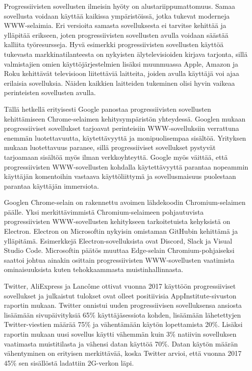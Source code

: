 \documentclass[utf8]{gradu3}
\begin{document}
Progressiivisten sovellusten ilmeisin hyöty on alustariippumattomuus. Samaa sovellusta voidaan käyttää kaikissa ympäristöissä, jotka tukevat moderneja WWW-selaimia. Eri versioita samasta sovelluksesta ei tarvitse kehittää ja ylläpitää erikseen, joten progressiivisten sovellusten avulla voidaan säästää kalliita työresursseja. Hyvä esimerkki progressiivisten sovellusten käyttöä tukevasta markkinatilanteesta on nykyisten älytelevisioiden kirjava tarjonta, sillä valmistajien omien käyttöjärjestelmien lisäksi muunmuassa Apple, Amazon ja Roku kehittävät televisioon liitettäviä laitteita, joiden avulla käyttäjä voi ajaa erilaisia sovelluksia. Näiden kaikkien laitteiden tukeminen olisi hyvin vaikeaa perinteisten sovellusten avulla. \parencite[]{frankston-pwa}

Tällä hetkellä erityisesti Google panostaa progressiivisten sovellusten kehittämiseen Chrome-selaimen kehitysympäristön yhteydessä. Googlen \parencite[]{google-pwa-marketing} mukaan progressiiviset sovellukset tarjoavat perinteisiin WWW-sovelluksiin verrattuna enemmän luotettavuutta, käytettävyyttä ja monipuolisempaa sisältöä. Yrityksen mukaan luotettavuus paranee, sillä progressiiviset sovellukset pystyvät tarjoamaan sisältöä myös ilman verkkoyhteyttä. Google myös väittää, että progressiivisten WWW-sovellusten kohdalla käytettävyyttä parantaa nopeammin käyttäjän komentoihin vastaava käyttöliittymä ja sovellusmaisuus puolestaan parantaa käyttäjän immersiota.

Googlen Chrome-selain on rakennettu avoimen lähdekoodin Chromium-selaimen päälle. Yksi merkittävimmistä Chromium-selaimeen pohjautuvista progressiivisten WWW-sovellusten kehitykseen tarkoitetuista kehyksistä on Electron. Electron on Microsoftin nykyisin omistaman GitHubin kehittämä ja ylläpitämä. Esimerkkejä Electron-sovelluksista ovat Discord, Slack ja Visual Studio Code. Microsoftin päätös muuttaa Edge-selain Chromium-pohjaiseksi saattoi johtua ainakin osittain progressiivisten WWW-sovellusten vaatimista ominaisuuksista kuten tehokkaammasta muistinhallinnasta.

Twitter, AliExpress ja Lancôme ottivat vuonna 2017 käyttöön progressiiviset sovellukset ja julkaistut tulokset ovat olleet positiivisia AppInstitute-sivuston raportin mukaan. Twitter onnistui uuden progressiivisen sovelluksensa ansiosta lisäämään sivupäivityksiä 65\% käyttäjäsessiota kohden, lisäämään lähetettyjen Twitter-viestien määrää 75\% ja vähentämään käytön lopettamista 20\%. Lisäksi raportin mukaan uusi sovellus käytti vähemmän kuin 3\% natiivin sovelluksen vaatimasta muistitilasta ja vähensi datan käyttöä 70\%. Datan käytön määrän vähentyminen on erityisen merkittävää, koska Twitter arvioi, että vuonna 2017 45\% sen sisällöstä ladattiin 2G-verkon läpi. \parencite[]{beginners-guide-pwa}
\end{document}
